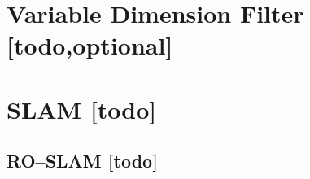 \begin{comment}
------------------------------------------------------------------------------------------
- \cite{kurth2003experimental}
	- Additionally, we will extend the batch method to produce a variable dimension lter, as used by Deans for the case of bearing-only sensors [3], which would consider some window of previous robot states and optimize the position estimates based on the data in that window.
\end{comment}
\section{Variable Dimension Filter [todo,optional]}


\begin{comment}
------------------------------------------------------------------------------------------
Embodied Localisation and Mapping
http://elib.suub.uni-bremen.de/edocs/00103537-1.pdf

- \cite{sarkka2013bayesian}
	- Bayesian filtering and smoothing
- \cite{kurth2003experimental}
	- The Kalman lter approach described in Section 5 can be reformulated for the SLAM problem. To perform SLAM, we include position estimates for each tag in the state, producing a state vector of the form: q(k) = [xk; yk; k; xb1; yb1 ; :::; xbn; ybn]T , where n is the number of beacons.
\end{comment}
\section{SLAM [todo]}


\begin{comment}
------------------------------------------------------------------------------------------
\end{comment}
\subsection{RO--SLAM [todo]}


\begin{comment}
------------------------------------------------------------------------------------------
- Launch Files
	- Tool to manage a robotic system
	- starting of multiple nodes
	- setting of parameter values
	- setting of arguments
	- including other launch files
- Parameter Server
	- Global key-value store for sharing configuration informationen
- Transformation
	- static
	- dynamic
	- TFs are implemented with a forward description from parent to child (from → to )
	- Each child frame has a maximum of one parent frame, but a parent frame can be linked to many child frames (tree structured)
	- Listener / Broadcaster
\end{comment}

